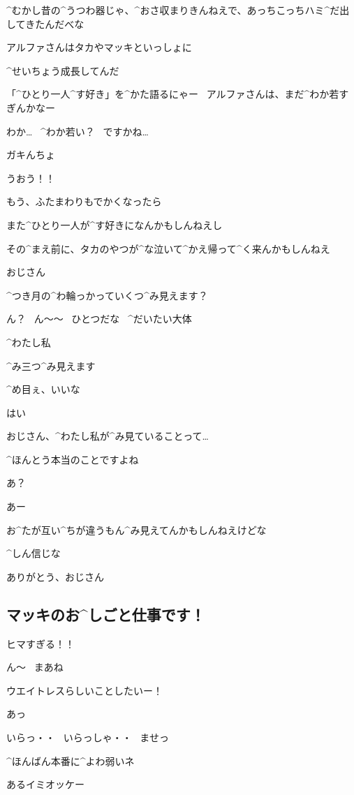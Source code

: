 \Ojisan ^{むかし}{昔}の^{うつわ}{器}じゃ、^{おさ}{収}まりきんねえで、あっちこっちハミ^{だ}{出}してきたんだべな

\Ojisan アルファさんはタカやマッキといっしょに

\Ojisan ^{せいちょう}{成長}してんだ

\Ojisan 「^{ひとり}{一人}^{す}{好}き」を^{かた}{語}るにゃー
\ アルファさんは、まだ^{わか}{若}すぎんかなー

\page[159]
\Alpha わか…
\ ^{わか}{若}い？
\ ですかね…

\Ojisan ガキんちょ

\Alpha うおう！！

\Ojisan もう、ふたまわりもでかくなったら

\Ojisan また^{ひとり}{一人}が^{す}{好}きになんかもしんねえし

\Ojisan その^{まえ}{前}に、タカのやつが^{な}{泣}いて^{かえ}{帰}って^{く}{来}んかもしんねえ

\page[160]
\Alpha おじさん

\Alpha ^{つき}{月}の^{わ}{輪}っかっていくつ^{み}{見}えます？

\Ojisan ん？
\ ん〜〜
\ ひとつだな
\ ^{だいたい}{大体}

\Alpha ^{わたし}{私}

\Alpha ^{み}{三}つ^{み}{見}えます

\page[161]
\Ojisan ^{め}{目}ぇ、いいな

\Alpha はい

\Alpha おじさん、^{わたし}{私}が^{み}{見}ていることって…

\Alpha ^{ほんとう}{本当}のことですよね

\Ojisan あ？

\Ojisan あー

\Ojisan お^{たが}{互}い^{ちが}{違}うもん^{み}{見}えてんかもしんねえけどな

\Ojisan ^{しん}{信}じな

\page[162]
\Alpha ありがとう、おじさん


\subsection{マッキのお^{しごと}{仕事}です！}

\Makki ヒマすぎる！！

\Alpha ん〜
\ まあね

\Makki ウエイトレスらしいことしたいー！

\Alpha あっ

\Makki いらっ・・
\ いらっしゃ・・
\ ませっ

\Alpha ^{ほんばん}{本番}に^{よわ}{弱}いネ

\Alpha あるイミオッケー
